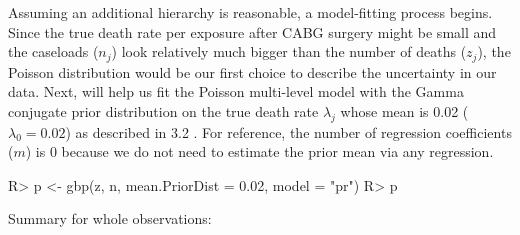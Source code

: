 \documentclass[article]{jss}
\begin{document}
Assuming an additional hierarchy is reasonable, a model-fitting process begins.  Since the true death rate per exposure after CABG surgery might be small and the caseloads ($n_{j}$) look relatively much bigger than the number of deaths ($z_{j}$), the Poisson distribution would be our first choice to describe the uncertainty in our data. Next,  will help us fit the Poisson multi-level model with the Gamma conjugate prior distribution on the true death rate $\lambda_{j}$ whose mean is 0.02 ($\lambda_{0}=0.02$) as described in 3.2 . For reference, the number of regression coefficients ($m$) is 0 because we do not need to estimate the prior mean via any regression.
\begin{CodeChunk}
\begin{CodeInput}
R> p <- gbp(z, n, mean.PriorDist = 0.02, model = "pr")
R> p
\end{CodeInput}
\begin{CodeOutput}
Summary for whole observations: 


\end{CodeOutput}
\end{CodeChunk}
\end{document}
